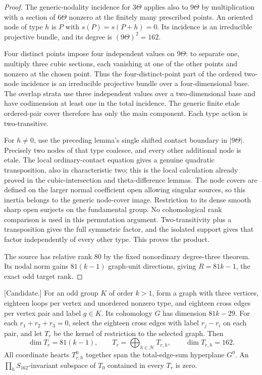 \begin{proof}
The generic-nodality incidence for $3\Theta$ applies also to
$9\Theta$ by multiplication with a section of $6\Theta$ nonzero
at the finitely many prescribed points. An oriented node of type
$h$ is $P$ with $s(P)=s(P+h)=0$. Its incidence is an irreducible
projective bundle, and its degree is $(9\Theta)^2=162$.

Four distinct points impose four independent values on $9\Theta$:
to separate one, multiply three cubic sections, each vanishing
at one of the other points and nonzero at the chosen point.
Thus the four-distinct-point part of the ordered two-node
incidence is an irreducible projective bundle over a four-dimensional
base. The overlap strata use three independent values over a
two-dimensional base and have codimension at least one in the
total incidence. The generic finite etale ordered-pair cover
therefore has only the main component. Each type action is
two-transitive.

For $h\ne0$, use the preceding lemma's single shifted contact
boundary in $|9\Theta|$. Precisely two nodes of that type
coalesce, and every other additional node is etale. The local
ordinary-contact equation gives a genuine quadratic transposition,
also in characteristic two; this is the local calculation already
proved in the cubic-intersection and theta-difference lemmas.
The node covers are defined on the larger normal coefficient
open allowing singular sources, so this inertia belongs to the
generic node-cover image. Restriction to its dense smooth sharp
open surjects on the fundamental group. No cohomological rank
comparison is used in this permutation argument.
Two-transitivity plus a transposition gives the full symmetric
factor, and the isolated support gives that factor independently
of every other type. This proves the product.

The source has relative rank $80$ by the fixed nonordinary
degree-three theorem. Its nodal norm gains $81(k-1)$ graph-unit
directions, giving $R=81k-1$, the exact odd target rank.
\end{proof}

\begin{lemma}
\label{lem:nine-theta-weighted-graph-candidate}
\textup{[Candidate.]}
For an odd group $K$ of order $k>1$, form a graph with three
vertices, eighteen loops per vertex and unordered nonzero type,
and eighteen cross edges per vertex pair and label $g\in K$.
Its cohomology $G$ has dimension $81k-29$. For each
$r_1+r_2+r_3=0$, select the eighteen cross edges with label
$r_j-r_i$ on each pair, and let $T_r$ be the kernel of restriction
to the selected graph. Then
\[
 \dim T_r=81(k-1),\qquad
 T_r=\bigoplus_{h\in\mathcal H}T_{r,h},\qquad
 \dim T_{r,h}=162.                              \tag{N9.2}
\]
All coordinate hearts $T_{r,h}^0$ together span the total-edge-sum
hyperplane $G^0$. An $\prod_hS_{162}$-invariant subspace of $T_0$
contained in every $T_r$ is zero.
\end{lemma}

